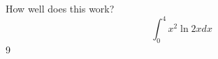 \documentclass{article}
\begin{document}
How well does this work?
$$\int_0^4 x^2 \ln{2x}dx$$
9
\end{document}

